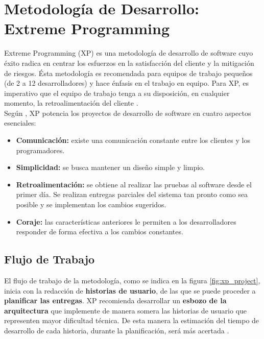 \section[Metodología de Desarrollo: XP]{Metodología de Desarrollo: Extreme Programming}
Extreme Programming (XP) es una metodología de desarrollo de software cuyo éxito radica en centrar los esfuerzos en la satisfacción del cliente y la mitigación de riesgos. Ésta metodología es recomendada para equipos de trabajo pequeños (de 2 a 12 desarrolladores) y hace énfasis en el trabajo en equipo. Para XP, es imperativo que el equipo de trabajo tenga a su disposición, en cualquier momento, la retroalimentación del cliente \citep{Metodologia_XP_when2006}.\\

Según \citeauthor{Metodologia_XP_whatis2006}, XP potencia los proyectos de desarrollo de software en cuatro aspectos esenciales:

\begin{itemize}
	\item \textbf{Comunicación:} existe una comunicación constante entre los clientes y los programadores.
	\item \textbf{Simplicidad:} se busca mantener un diseño simple y limpio.
	\item \textbf{Retroalimentación:} se obtiene al realizar las pruebas al software desde el primer día. Se realizan entregas parciales del sistema tan pronto como sea posible y se implementan los cambios sugeridos.
	\item \textbf{Coraje:} las características anteriores le permiten a los desarrolladores responder de forma efectiva a los cambios constantes.
\end{itemize}

\subsection{Flujo de Trabajo}
El flujo de trabajo de la metodología, como se indica en la figura \ref{fig:xp_project}, inicia con la redacción de \textbf{historias de usuario}, de las que se puede proceder a \textbf{planificar las entregas}. XP recomienda desarrollar un \textbf{esbozo de la arquitectura} que implemente de manera somera las historias de usuario que representen mayor dificultad técnica. De esta manera la estimación del tiempo de desarrollo de cada historia, durante la planificación, será más acertada \citep{Metodologia_XP_flujograma2006}. \\

